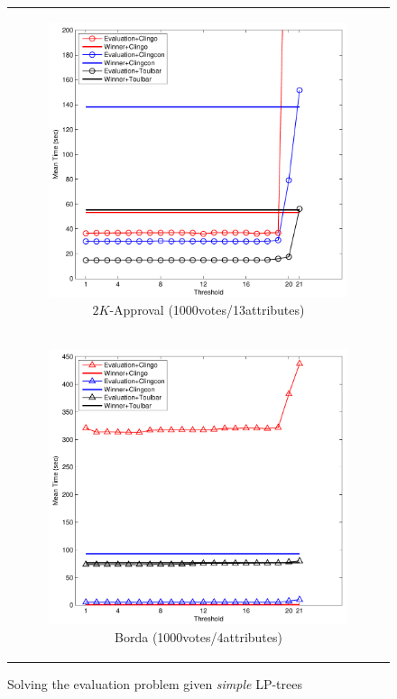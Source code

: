 \begin{figure}[!ht]
\begin{tabular}{c}
\begin{subfigure}[b]{0.5\textwidth}
		\includegraphics[width=\textwidth]{figs/2kAppMSCICP_1000v_13i.pdf}
    \caption{$2K$-Approval (1000votes/13attributes)}
		\label{fig:comparison:eval:2}
	\end{subfigure}
  \\
  \begin{subfigure}[b]{0.5\textwidth}
		\includegraphics[width=\textwidth]{figs/bordaMSCICP_1000v_4i.pdf}
    \caption{Borda (1000votes/4attributes)}
		\label{fig:comparison:eval:3}
	\end{subfigure}
	\end{tabular}
  \caption{Solving the evaluation problem given \textit{simple} LP-trees}
  \label{fig:eval}
\end{figure}

